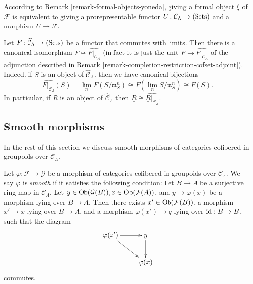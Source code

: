 \begin{remark}
\label{remark-spell-out-formal-object}
According to Remark \ref{remark-formal-objects-yoneda}, giving a formal object 
$\xi$ of $\mathcal F$ is equivalent to giving a prorepresentable functor $U: 
\mathcal C_{\Lambda} \rightarrow \textnormal{(Sets)}$ and a morphism $U 
\rightarrow \mathcal{F}$. 
\end{remark}

\begin{remark}
\label{remark-restrict-complete-continuous-functor}
Let $F : \widehat{\mathcal C}_{\Lambda} \rightarrow \textnormal{(Sets)}$ be a 
functor that commutes with limits.  Then there is a canonical isomorphism $F 
\cong \widehat{F|_{\mathcal C_{\Lambda}}}$ (in fact it is just the unit $F 
\rightarrow \widehat{F|_{\mathcal C_{\Lambda}}}$ of the adjunction described in 
Remark \ref{remark-completion-restriction-cofset-adjoint}).  Indeed, if $S$ is 
an object of $\widehat{\mathcal C}_{\Lambda}$, then we have canonical bijections
\[ \widehat{F|_{\mathcal C_{\Lambda}}}(S) = \lim_{n} F(S/\mathfrak{m}_{S}^n) 
\cong F(\lim_{n} S/\mathfrak{m}_{S}^n) \cong F(S). \]
In particular, if $R$ is an object of $\widehat{\mathcal C}_{\Lambda}$ then 
$\underline{R} \cong \widehat{\underline{R}|_{\mathcal C_{\Lambda}}}$.
\end{remark}




\subsection{Smooth morphisms}
\label{subsection-smooth-morphisms}

\noindent
In the rest of this section we discuss smooth morphisms of categories 
cofibered in groupoids over $\mathcal C_{\Lambda}$.

\begin{definition}
\label{definition-smooth-morphism}
Let $\varphi: \mathcal F \rightarrow \mathcal G$ be a morphism of categories 
cofibered in groupoids over $\mathcal C_{\Lambda}$.  We say  $\varphi$ is 
{\it smooth} if it satisfies the following condition: Let $B \rightarrow A$ be 
a surjective ring map in $\mathcal C_{\Lambda}$.  Let $y \in 
\textnormal{Ob}(\mathcal G(B)), x \in \textnormal{Ob}(\mathcal F(A))$, and $y 
\rightarrow \varphi(x)$ be a morphism lying over $B \rightarrow A$.  Then there 
exists $x' \in \textnormal{Ob}(\mathcal F(B))$, a morphism $x' \rightarrow x$ 
lying over $B \rightarrow A$, and a morphism $\varphi(x') \rightarrow y$ lying 
over $\textnormal{id}: B \rightarrow B$, such that the diagram
\[
\xymatrix{
\varphi(x') \ar[r] \ar[dr] & y \ar[d] \\
                        & \varphi(x)
}
\]
commutes.
\end{definition}

